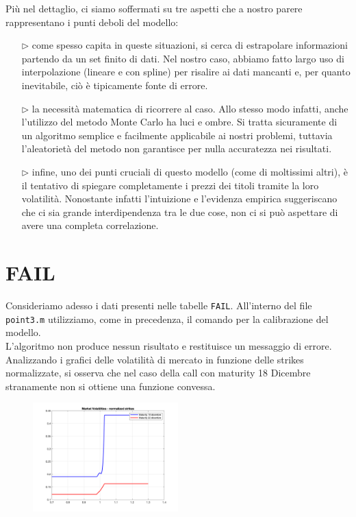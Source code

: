 \documentclass[11pt]{article}
\begin{document}
Più nel dettaglio, ci siamo soffermati su tre aspetti che a nostro parere rappresentano i punti deboli del modello:

\begin{itemize}
	\item[$\rhd$] come spesso capita in queste situazioni, si cerca di estrapolare informazioni partendo da un set finito di dati. Nel nostro caso, abbiamo fatto largo uso di interpolazione (lineare e con spline) per risalire ai dati mancanti e, per quanto inevitabile, ciò è tipicamente fonte di errore.
	\item[$\rhd$] la necessità matematica di ricorrere al caso. Allo stesso modo infatti, anche l'utilizzo del metodo Monte Carlo ha luci e ombre. Si tratta sicuramente di un algoritmo semplice e facilmente applicabile ai nostri problemi, tuttavia l'aleatorietà del metodo non garantisce per nulla accuratezza nei risultati.
	\item[$\rhd$] infine, uno dei punti cruciali di questo modello (come di moltissimi altri), è il tentativo di spiegare completamente i prezzi dei titoli tramite la loro volatilità. Nonostante infatti l'intuizione e l'evidenza empirica suggeriscano che ci sia grande interdipendenza tra le due cose, non ci si può aspettare di avere una completa correlazione.
\end{itemize}

\vfill
\section{FAIL}
Consideriamo adesso i dati presenti nelle tabelle \texttt{FAIL}. All'interno del file \texttt{point3.m} utilizziamo, come in precedenza, il comando per la calibrazione del modello.\\ L'algoritmo non produce nessun risultato e restituisce un messaggio di errore.
Analizzando i grafici delle volatilità di mercato in funzione delle strikes normalizzate, si osserva che nel caso della call con maturity 18 Dicembre stranamente non si ottiene una funzione convessa. 

\begin{figure}[H]
\centering
\includegraphics[width=0.5\textwidth]{MktVol_Knorm}
\end{figure}
\end{document}
